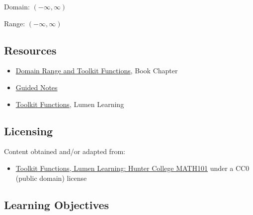 Domain: $( -\infty ,\infty )$



Range: $( -\infty ,\infty )$




\subsection{Resources}
\label{sss:reso-55b5}




\begin{itemize}
    \item \href{https://mathresearch.utsa.edu/wikiFiles/MAT1053/Domain_Range_and_Toolkit_Functions/MAT1053_M1.2Domain_Range_and_Toolkit_Functions.pdf}{Domain Range and Toolkit Functions}, Book Chapter
    \item \href{https://mathresearch.utsa.edu/wikiFiles/MAT1053/Domain_Range_and_Toolkit_Functions/MAT1053_M1.2Domain_Range_and_Toolkit_FunctionsGN.pdf}{Guided Notes}
    \item \href{https://courses.lumenlearning.com/cuny-hunter-collegealgebra/chapter/toolkit-functions/}{Toolkit Functions}, Lumen Learning
\end{itemize}


\subsection{Licensing}
\label{sss:lice-735212}




Content obtained and/or adapted from:



\begin{itemize}
    \item \href{https://courses.lumenlearning.com/cuny-hunter-collegealgebra/chapter/toolkit-functions/}{Toolkit Functions, Lumen Learning: Hunter College MATH101} under a CC0 (public domain) license
\end{itemize}


\subsection{Learning Objectives}
\label{ssec:lear-fe6e}


